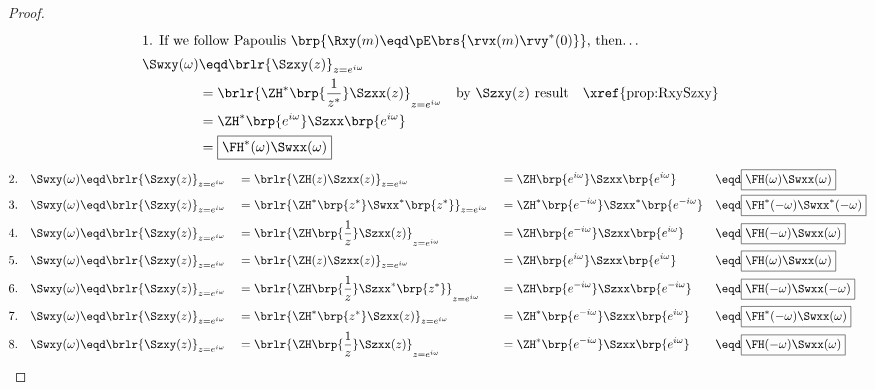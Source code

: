\begin{proof}
\begin{align*}
\intertext{1. If we follow Papoulis $\brp{\Rxy(m)\eqd\pE\brs{\rvx(m)\rvy^\ast(0)}}$, then\ldots}
    \Swxy(\omega)
      &\eqd \brlr{\Szxy(z)}_{z=e^{i\omega}}
    \\&=    \brlr{\ZH^\ast\brp{\frac{1}{z^\ast}} \Szxx(z)}_{z=e^{i\omega}}
      &&    \text{by $\Szxy(z)$ result}
      &&    \text{\xref{prop:RxySzxy}}
    \\&=    \ZH^\ast\brp{e^{i\omega}} \Szxx\brp{e^{i\omega}}
    \\&=    \boxed{\FH^\ast(\omega) \Swxx(\omega)}
\end{align*}
\begin{align*}
    2.\quad\Swxy(\omega)
      &\eqd \brlr{\Szxy(z)}_{z=e^{i\omega}}
     &&=    \brlr{\ZH(z) \Szxx(z)}_{z=e^{i\omega}}
     &&=    \ZH\brp{e^{i\omega}} \Szxx\brp{e^{i\omega}}
     &&\eqd \boxed{\FH(\omega) \Swxx(\omega)}
\\
    3.\quad\Swxy(\omega)
      &\eqd \brlr{\Szxy(z)}_{z=e^{i\omega}}
     &&=    \brlr{\ZH^\ast\brp{z^\ast} \Swxx^\ast\brp{z^\ast}}_{z=e^{i\omega}}
     &&=    \ZH^\ast\brp{e^{-i\omega}} \Szxx^\ast\brp{e^{-i\omega}}
     &&\eqd \boxed{\FH^\ast(-\omega) \Swxx^\ast(-\omega)}
\\
    4.\quad\Swxy(\omega)
      &\eqd \brlr{\Szxy(z)}_{z=e^{i\omega}}
     &&=    \brlr{\ZH\brp{\frac{1}{z}} \Szxx(z)}_{z=e^{i\omega}}
     &&=    \ZH\brp{e^{-i\omega}} \Szxx\brp{e^{i\omega}}
     &&\eqd \boxed{\FH(-\omega) \Swxx(\omega)}
\\
    5.\quad\Swxy(\omega)
      &\eqd \brlr{\Szxy(z)}_{z=e^{i\omega}}
     &&=    \brlr{\ZH(z) \Szxx(z)}_{z=e^{i\omega}}
     &&=    \ZH\brp{e^{i\omega}} \Szxx\brp{e^{i\omega}}
     &&\eqd \boxed{\FH(\omega) \Swxx(\omega)}
\\
    6.\quad\Swxy(\omega)
      &\eqd \brlr{\Szxy(z)}_{z=e^{i\omega}}
     &&=    \brlr{\ZH\brp{\frac{1}{z}} \Szxx^\ast\brp{z^\ast}}_{z=e^{i\omega}}
     &&=    \ZH\brp{e^{-i\omega}} \Szxx\brp{e^{-i\omega}}
     &&\eqd \boxed{\FH(-\omega) \Swxx(-\omega)}
\\
    7.\quad\Swxy(\omega)
      &\eqd \brlr{\Szxy(z)}_{z=e^{i\omega}}
     &&=    \brlr{\ZH^\ast\brp{z^\ast} \Szxx(z)}_{z=e^{i\omega}}
     &&=    \ZH^\ast\brp{e^{-i\omega}} \Szxx\brp{e^{i\omega}}
     &&\eqd \boxed{\FH^\ast(-\omega) \Swxx(\omega)}
\\
    8.\quad\Swxy(\omega)
      &\eqd \brlr{\Szxy(z)}_{z=e^{i\omega}}
     &&=    \brlr{\ZH\brp{\frac{1}{z}} \Szxx(z)}_{z=e^{i\omega}}
     &&=    \ZH^\ast\brp{e^{-i\omega}} \Szxx\brp{e^{i\omega}}
     &&\eqd \boxed{\FH(-\omega) \Swxx(\omega)}
  \end{align*}
\end{proof}

